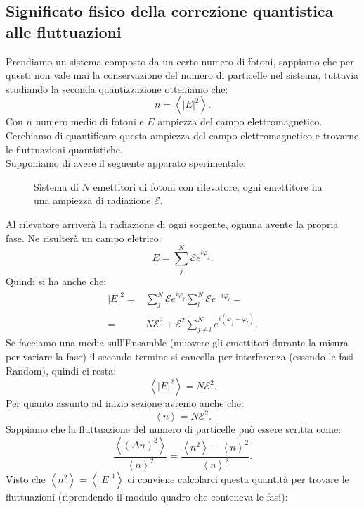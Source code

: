 \subsection{Significato fisico della correzione quantistica alle fluttuazioni}
\label{subsec:Significato fisico della correzione quantistica alle fluttuazioni}
Prendiamo un sistema composto da un certo numero di fotoni, sappiamo che per questi non vale mai la conservazione del numero di particelle nel sistema, tuttavia studiando la seconda quantizzazione otteniamo che:
\[
	n = \left< \left| E \right|^2 \right>
.\] 
Con $n$ numero medio di fotoni e $E$ ampiezza del campo elettromagnetico. \\
Cerchiamo di quantificare questa ampiezza del campo elettromagnetico e trovarne le fluttuazioni quantistiche.\\
Supponiamo di avere il seguente apparato sperimentale:
\begin{figure}[H]
    \centering
    \caption{Sistema di $N$ emettitori di fotoni con rilevatore, ogni emettitore ha una ampiezza di radiazione $\mathcal{E} $.}
    \label{fig:sistema-di-emettitori-di-fotoni-con-rilevatore}
\end{figure}
\noindent
Al rilevatore arriverà la radiazione di ogni sorgente, ognuna avente la propria fase. Ne risulterà un campo eletrico:
\[
	E = \sum_{j}^{N} \mathcal{E} e^{i \varphi_j}
.\] 
Quindi si ha anche che:
\[\begin{aligned}
	\left| E \right|^2 
	=&
	\sum_{j}^{N} \mathcal{E} e^{i \varphi_j} 
	\sum_{l}^{N} \mathcal{E} e^{-i \varphi_l}=\\
	=&
	N\mathcal{E} ^2 
	+
	\mathcal{E} ^2 \sum_{j \neq l}^{N} e^{i\left( \varphi_j - \varphi_l \right) }
.\end{aligned}\]
Se facciamo una media sull'Ensamble (muovere gli emettitori durante la misura per variare la fase) il secondo termine si cancella per interferenza (essendo le fasi Random), quindi ci resta:
\[
	\left<\left| E \right|^2 \right> 
	= 
	N \mathcal{E} ^2
.\] 
Per quanto assunto ad inizio sezione avremo anche che:
\[
	\left<n \right> 
	=
	N \mathcal{E}^2
.\] 
Sappiamo che la fluttuazione del numero di particelle può essere scritta come:
\[
	\frac{\left<\left( \Delta n \right) ^2 \right>}{\left< n \right>^2}
	= 
	\frac{\left<n^2 \right>-\left<n \right>^2}{\left<n \right>^2}
.\] 
Visto che $\left<n^2\right> = \left< \left| E \right| ^4 \right>$ ci conviene calcolarci questa quantità per trovare le fluttuazioni (riprendendo il modulo quadro che conteneva le fasi):

